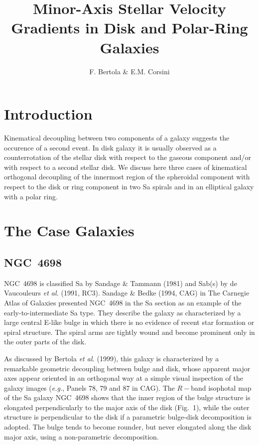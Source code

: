 
\def\kms{$\rm km\;s^{-1}$}




\title{Minor-Axis Stellar Velocity Gradients in Disk and Polar-Ring
Galaxies}
\author{F. Bertola \& E.M. Corsini}




\section{Introduction}

Kinematical decoupling between two components of a galaxy suggests the
occurence of a second event.  In disk galaxy it is usually observed as a
counterrotation of the stellar disk with respect to the gaseous component
and/or with respect to a second stellar disk.  We discuss here three
cases of kinematical orthogonal decoupling of the innermost region of the
spheroidal component with respect to the disk or ring component in two Sa
spirals and in an elliptical galaxy with a polar ring.



\section{The Case Galaxies} 

\subsection{NGC~4698}

NGC~4698 is classified Sa by Sandage \& Tammann (1981) and Sab(s) by de
Vaucouleurs {\it et al.\/} (1991, RC3).  Sandage \& Bedke (1994, CAG) in The
Carnegie Atlas of Galaxies presented NGC~4698 in the Sa section as an example
of the early-to-intermediate Sa type.  They describe the galaxy as
characterized by a large central E-like bulge in which there is no evidence
of recent star formation or spiral structure.  The spiral arms are tightly
wound and become prominent only in the outer parts of the disk.

As discussed by Bertola {\it et al.\/} (1999), this galaxy is characterized
by a remarkable geometric decoupling between bulge and disk, whose apparent
major axes appear oriented in an orthogonal way at a simple visual inspection
of the galaxy images ({\it e.g.\/}, Panels 78, 79 and 87 in CAG).  The
$R-$band isophotal map of the Sa galaxy NGC~4698 shows that the inner region
of the bulge structure is elongated perpendicularly to the major axis of the
disk (Fig.~1), while the outer structure is perpendicular to the disk if a
parametric bulge-disk decomposition is adopted.  The bulge tends to become
rounder, but never elongated along the disk major axis, using a
non-parametric decomposition.


